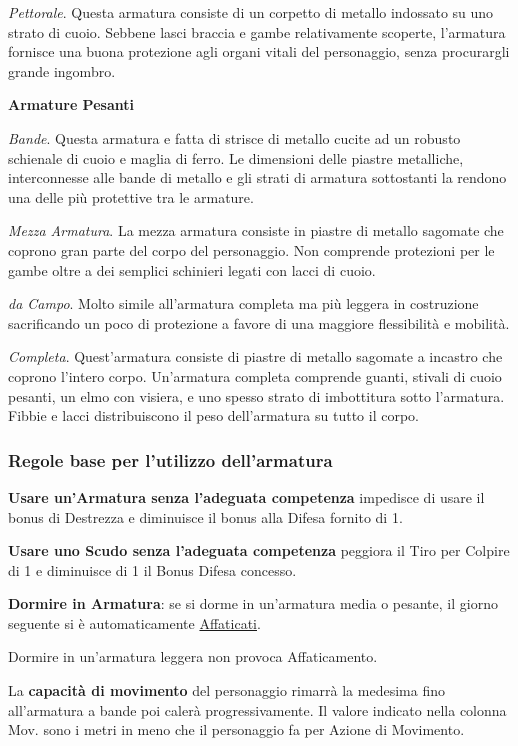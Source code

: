 \begin{multicols}{2}
\emph{Pettorale}. Questa armatura consiste di un corpetto di metallo indossato su uno strato di cuoio. Sebbene lasci braccia e gambe relativamente scoperte, l'armatura fornisce una buona protezione agli organi vitali del personaggio, senza procurargli grande ingombro.

\textbf{Armature Pesanti}

\emph{Bande}. Questa armatura e fatta di strisce di metallo cucite ad un robusto schienale di cuoio e maglia di ferro. Le dimensioni delle piastre metalliche, interconnesse alle bande di metallo e gli strati di armatura sottostanti la rendono una delle più protettive tra le armature.

\emph{Mezza Armatura}. La mezza armatura consiste in piastre di metallo sagomate che coprono gran parte del corpo del personaggio. Non comprende protezioni per le gambe oltre a dei semplici schinieri legati con lacci di cuoio.

\emph{da Campo}. Molto simile all'armatura completa ma più leggera in costruzione sacrificando un poco di protezione a favore di una maggiore flessibilità e mobilità.

\emph{Completa}. Quest'armatura consiste di piastre di metallo sagomate a incastro che coprono l'intero corpo. Un'armatura completa comprende guanti, stivali di cuoio pesanti, un elmo con visiera, e uno spesso strato di imbottitura sotto l'armatura. Fibbie e lacci distribuiscono il peso dell'armatura su tutto il corpo.

\subsubsection{Regole base per l'utilizzo dell'armatura}

\textbf{Usare un'Armatura senza l'adeguata competenza} impedisce di usare il bonus di Destrezza e diminuisce il bonus alla Difesa fornito di 1.

\textbf{Usare uno Scudo senza l'adeguata competenza} peggiora il Tiro per Colpire di 1 e diminuisce di 1 il Bonus Difesa concesso.

\textbf{Dormire in Armatura}: se si dorme in un'armatura media o pesante, il giorno seguente si è automaticamente \hyperlink{affaticato}{Affaticati}.

Dormire in un'armatura leggera non provoca Affaticamento.

La \textbf{capacità di movimento} del personaggio rimarrà la medesima fino all'armatura a bande poi calerà progressivamente. Il valore indicato nella colonna Mov. sono i metri in meno che il personaggio fa per Azione di Movimento.


\end{multicols}
